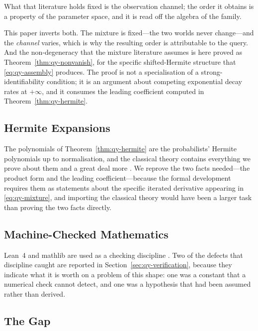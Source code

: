 What that literature holds fixed is the observation channel; the order it obtains is a
property of the parameter space, and it is read off the algebra of the family.

This paper inverts both. The mixture is fixed---the two worlds never change---and the
\emph{channel} varies, which is why the resulting order is attributable to the query. And
the non-degeneracy that the mixture literature assumes is here proved as
Theorem~\ref{thm:qy-nonvanish}, for the specific shifted-Hermite structure that
\eqref{eq:qy-assembly} produces. The proof is not a specialisation of a strong-identifiability
condition; it is an argument about competing exponential decay rates at $+\infty$, and it
consumes the leading coefficient computed in Theorem~\ref{thm:qy-hermite}.

\subsection{Hermite Expansions}

The polynomials of Theorem~\ref{thm:qy-hermite} are the probabilists' Hermite polynomials up to
normalisation, and the classical theory contains everything we prove about them and a great
deal more \cite{szego1939}. We reprove the two facts needed---the product form and the
leading coefficient---because the formal development requires them as statements about the
specific iterated derivative appearing in \eqref{eq:qy-mixture}, and importing the classical
theory would have been a larger task than proving the two facts directly.

\subsection{Machine-Checked Mathematics}

Lean~4 and mathlib are used as a checking discipline \cite{demoura2021,mathlib2020}. Two of
the defects that discipline caught are reported in Section~\ref{sec:qy-verification}, because
they indicate what it is worth on a problem of this shape: one was a constant that a
numerical check cannot detect, and one was a hypothesis that had been assumed rather than
derived.

\subsection{The Gap}

